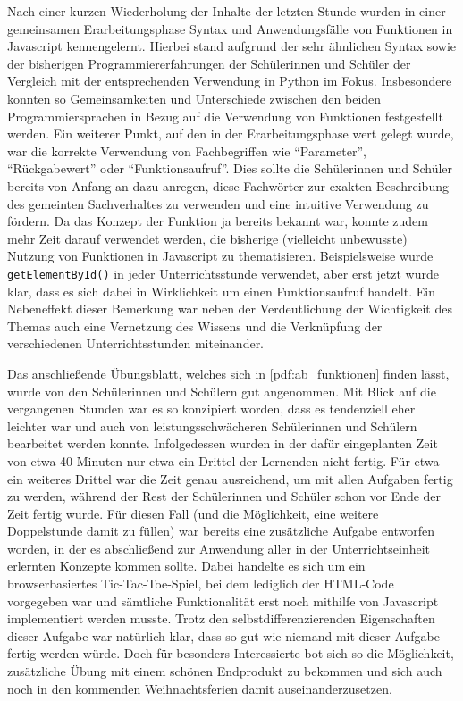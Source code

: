 Nach einer kurzen Wiederholung der Inhalte der letzten Stunde wurden in einer gemeinsamen Erarbeitungsphase Syntax und Anwendungsfälle von Funktionen in Javascript kennengelernt.
Hierbei stand aufgrund der sehr ähnlichen Syntax sowie der bisherigen Programmiererfahrungen der Schülerinnen und Schüler der Vergleich mit der entsprechenden Verwendung in Python im Fokus.
Insbesondere konnten so Gemeinsamkeiten und Unterschiede zwischen den beiden Programmiersprachen in Bezug auf die Verwendung von Funktionen festgestellt werden.
Ein weiterer Punkt, auf den in der Erarbeitungsphase wert gelegt wurde, war die korrekte Verwendung von Fachbegriffen wie ``Parameter'', ``Rückgabewert'' oder ``Funktionsaufruf''.
Dies sollte die Schülerinnen und Schüler bereits von Anfang an dazu anregen, diese Fachwörter zur exakten Beschreibung des gemeinten Sachverhaltes zu verwenden und eine intuitive Verwendung zu fördern.
Da das Konzept der Funktion ja bereits bekannt war, konnte zudem mehr Zeit darauf verwendet werden, die bisherige (vielleicht unbewusste) Nutzung von Funktionen in Javascript zu thematisieren.
Beispielsweise wurde \texttt{getElementById()} in jeder Unterrichtsstunde verwendet, aber erst jetzt wurde klar, dass es sich dabei in Wirklichkeit um einen Funktionsaufruf handelt.
Ein Nebeneffekt dieser Bemerkung war neben der Verdeutlichung der Wichtigkeit des Themas auch eine Vernetzung des Wissens und die Verknüpfung der verschiedenen Unterrichtsstunden miteinander.

Das anschließende Übungsblatt, welches sich in \autoref{pdf:ab_funktionen} finden lässt, wurde von den Schülerinnen und Schülern gut angenommen.
Mit Blick auf die vergangenen Stunden war es so konzipiert worden, dass es tendenziell eher leichter war und auch von leistungsschwächeren Schülerinnen und Schülern bearbeitet werden konnte.
Infolgedessen wurden in der dafür eingeplanten Zeit von etwa 40 Minuten nur etwa ein Drittel der Lernenden nicht fertig.
Für etwa ein weiteres Drittel war die Zeit genau ausreichend, um mit allen Aufgaben fertig zu werden, während der Rest der Schülerinnen und Schüler schon vor Ende der Zeit fertig wurde.
Für diesen Fall (und die Möglichkeit, eine weitere Doppelstunde damit zu füllen) war bereits eine zusätzliche Aufgabe entworfen worden, in der es abschließend zur Anwendung aller in der Unterrichtseinheit erlernten Konzepte kommen sollte.
Dabei handelte es sich um ein browserbasiertes Tic-Tac-Toe-Spiel, bei dem lediglich der HTML-Code vorgegeben war und sämtliche Funktionalität erst noch mithilfe von Javascript implementiert werden musste.
Trotz den selbstdifferenzierenden Eigenschaften dieser Aufgabe war natürlich klar, dass so gut wie niemand mit dieser Aufgabe fertig werden würde.
Doch für besonders Interessierte bot sich so die Möglichkeit, zusätzliche Übung mit einem schönen Endprodukt zu bekommen und sich auch noch in den kommenden Weihnachtsferien damit auseinanderzusetzen.


